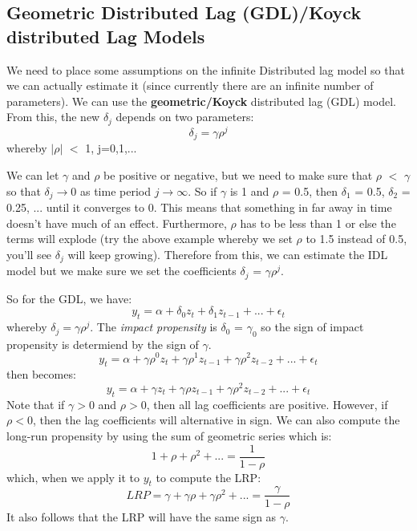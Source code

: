 \documentclass[11pt, oneside]{article}
\theoremstyle{definition}
\begin{document}
\subsection{Geometric Distributed Lag (GDL)/Koyck distributed Lag Models}
We need to place some assumptions on the infinite Distributed lag model so that we can actually estimate it (since currently there are an infinite number of parameters). We can use the \textbf{geometric/Koyck} distributed lag (GDL) model. From this, the new $\delta_j$ depends on two parameters:
$$
\delta_j = \gamma \rho^j
$$
whereby $| \rho |$ $<$ 1, j=0,1,...

We can let $\gamma$ and $\rho$ be positive or negative, but we need to make sure that $\rho$ $<$ $\gamma$ so that $\delta_j \rightarrow 0$ as time period $j \rightarrow \infty$. So if $\gamma$ is 1 and $\rho$ = 0.5, then $\delta_1$ = 0.5, $\delta_2$ = 0.25, ... until it converges to 0. This means that something in far away in time doesn't have much of an effect. Furthermore, $\rho$ has to be less than 1 or else the terms will explode (try the above example whereby we set $\rho$ to 1.5 instead of 0.5, you'll see $\delta_j$ will keep growing). Therefore from this, we can estimate the IDL model but we make sure we set the coefficients $\delta_j$ = $\gamma \rho^j$.

So for the GDL, we have:
$$
y_t = \alpha + \delta_0 z_t + \delta_1 z_{t-1} + ... + \epsilon_t
$$
whereby $\delta_j = \gamma \rho^j$. The \textit{impact propensity} is $\delta_0$ = $\gamma_0$ so the sign of impact propensity is determiend by the sign of $\gamma$.
$$
y_t = \alpha + \gamma \rho^0 z_t + \gamma \rho^1 z_{t-1} + \gamma \rho^2 z_{t-2} + ... + \epsilon_t
$$
then becomes:
$$
y_t = \alpha + \gamma z_t + \gamma \rho z_{t-1} + \gamma \rho^2 z_{t-2} + ... + \epsilon_t
$$
Note that if $\gamma > 0$ and $\rho>0$, then all lag coefficients are positive. However, if $\rho < 0$, then the lag coefficients will alternative in sign. We can also compute the long-run propensity by using the sum of geometric series which is:
$$
1 + \rho + \rho^2 + ...= \frac{1}{1-\rho}
$$
which, when we apply it to $y_t$ to compute the LRP:
$$
LRP = \gamma + \gamma \rho + \gamma \rho^2 + ...= \frac{\gamma}{1-\rho}
$$
It also follows that the LRP will have the same sign as $\gamma$.
\end{document}
